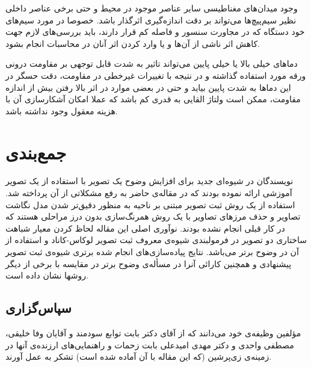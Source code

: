 \documentclass[conference]{IEEEtran-ModifiedForMVIP}
\begin{document}
 وجود میدان‌های مغناطیسی سایر عناصر موجود در محیط و حتی برخی عناصر داخلی نظیر سیم‌پیچ‌ها می‌تواند بر دقت اندازه‌گیری اثرگذار باشد. خصوصا در مورد سیم‌های خود دستگاه که در مجاورت سنسور و فاصله کم قرار دارند، باید بررسی‌های لازم جهت کاهش اثر ناشی از آن‌ها و یا وارد کردن اثر آنان در محاسبات انجام بشود. \cite{ratna}
 
 دماهای خیلی بالا یا خیلی پایین می‌تواند تاثیر به شدت قابل توجهی بر مقاومت درونی ورقه مورد استفاده گذاشته \cite{ratna} و در نتیجه با تغییرات غیرخطی در مقاومت، دقت حسگر در این دماها به شدت پایین بیاید و حتی در بعضی موارد در اثر بالا رفتن بیش از اندازه مقاومت،‌ ممکن است ولتاژ القایی به قدری کم باشد که عملا امکان آشکارسازی آن با هزینه معقول وجود نداشته باشد.
 
\section{جمع‌بندی}\label{Sec:Conclusion}
نویسندگان در شیوه‌ای جدید برای افزایش وضوح یک تصویر با استفاده از یک تصویر آموزشی ارائه نموده بودند که در مقاله‌ی حاضر به رفع مشکلاتی از آن پرداخته شد. استفاده از یک روش ثبت تصویر مبتنی بر ناحیه به منظور دقیق‌تر شدن مدل نگاشت تصاویر و حذف مرزهای تصاویر با یک روش همرنگ‌سازی بدون درز مراحلی هستند که در کار قبلی انجام نشده بودند. نوآوری اصلی این مقاله لحاظ کردن معیار شباهت ساختاری دو تصویر در فرمولبندی شیوه‌ی معروف ثبت تصویر لوکاس-کاناد و استفاده از آن در وضوح برتر می‌باشد. نتایج پیاده‌سازی‌های انجام شده برتری شیوه‌ی ثبت تصویر پیشنهادی و همچنین کارائی آنرا در مسأله‌ی وضوح برتر در مقایسه با برخی از دیگر روشها نشان داده است.

\subsection*{سپاس‌گزاری}
مؤلفین وظیفه‌ی خود می‌دانند که از آقای دکتر  بابت توابع سودمند  
و آقایان وفا خلیقی، مصطفی واحدی و دکتر مهدی امیدعلی بابت زحمات و راهنمایی‌های ارزنده‌ی آنها در زمینه‌ی
زی‌پرشین (که این مقاله با آن آماده شده است) تشکر به عمل آورند. 



{
\small %
\renewcommand{\refname}{\rl{مراجع\hfill}}

}
\end{document}
